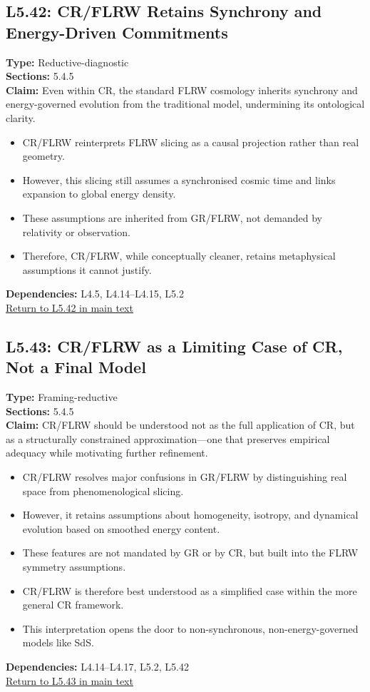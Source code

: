\documentclass[12pt]{book}
\newcommand{\returnlink}[1]{\hyperref[logic:#1]{Return to #1 in main text}\xspace}
\begin{document}
\subsection*{L5.42: CR/FLRW Retains Synchrony and Energy-Driven Commitments}
\label{appendix:L5.42}
\textbf{Type:} Reductive-diagnostic \\
\textbf{Sections:} 5.4.5 \\
\textbf{Claim:} Even within CR, the standard FLRW cosmology inherits synchrony and energy-governed evolution from the traditional model, undermining its ontological clarity.
\begin{itemize}
  \item CR/FLRW reinterprets FLRW slicing as a causal projection rather than real geometry.
  \item However, this slicing still assumes a synchronised cosmic time and links expansion to global energy density.
  \item These assumptions are inherited from GR/FLRW, not demanded by relativity or observation.
  \item Therefore, CR/FLRW, while conceptually cleaner, retains metaphysical assumptions it cannot justify.
\end{itemize}
\textbf{Dependencies:} L4.5, L4.14–L4.15, L5.2 \\
\returnlink{L5.42}

\subsection*{L5.43: CR/FLRW as a Limiting Case of CR, Not a Final Model}
\label{appendix:L5.43}
\textbf{Type:} Framing-reductive \\
\textbf{Sections:} 5.4.5 \\
\textbf{Claim:} CR/FLRW should be understood not as the full application of CR, but as a structurally constrained approximation---one that preserves empirical adequacy while motivating further refinement.
\begin{itemize}
  \item CR/FLRW resolves major confusions in GR/FLRW by distinguishing real space from phenomenological slicing.
  \item However, it retains assumptions about homogeneity, isotropy, and dynamical evolution based on smoothed energy content.
  \item These features are not mandated by GR or by CR, but built into the FLRW symmetry assumptions.
  \item CR/FLRW is therefore best understood as a simplified case within the more general CR framework.
  \item This interpretation opens the door to non-synchronous, non-energy-governed models like SdS.
\end{itemize}
\textbf{Dependencies:} L4.14–L4.17, L5.2, L5.42 \\
\returnlink{L5.43}
\end{document}
